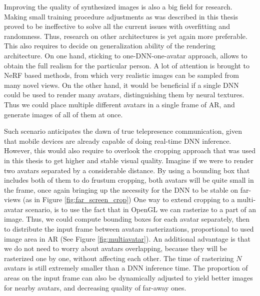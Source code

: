 Improving the quality of synthesized images is also a big field for research. Making small training procedure adjustments as was described in this thesis proved to be ineffective to solve all the current issues with overfitting and randomness. Thus, research on other architectures is yet again more preferable. This also requires to decide on generalization ability of the rendering architecture. On one hand, sticking to one-DNN-one-avatar approach, allows to obtain the full realism for the particular person. A lot of attention is brought to NeRF \cite{dnn:nerf20, dnn:phorhum22} based methods, from which very realistic images can be sampled from many novel views. On the other hand, it would be beneficial if a single DNN could be used to render many avatars, distinguishing them by neural textures. Thus we could place multiple different avatars in a single frame of AR, and generate images of all of them at once. 

Such scenario anticipates the dawn of true telepresence communication, given that mobile devices are already capable of doing real-time DNN inference. However, this would also require to overlook the cropping approach that was used in this thesis to get higher and stable visual quality. Imagine if we were to render two avatars separated by a considerable distance. By using a bounding box that includes both of them to do frustum cropping, both avatars will be quite small in the frame, once again bringing up the necessity for the DNN to be stable on far-views (as in Figure \ref{fig:far_screen_crop}) One way to extend cropping to a multi-avatar scenario, is to use the fact that in OpenGL we can rasterize to a part of an image. Thus, we could compute bounding boxes for each avatar separately, then to distribute the input frame between avatars rasterizations, proportional to used image area in AR (See Figure \ref{fig:multiavatar}). An additional advantage is that we do not need to worry about avatars overlapping, because they will be rasterized one by one, without affecting each other. The time of rasterizing $N$ avatars is still extremely smaller than a DNN inference time. The proportion of areas on the input frame can also be dynamically adjusted to yield better images for nearby avatars, and decreasing quality of far-away ones.

